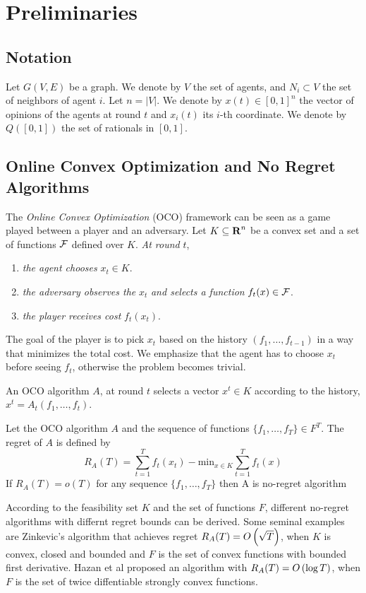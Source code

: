 \section{Preliminaries}\label{s:preliminaries}
\subsection{Notation}
Let $G(V,E)$ be a graph. We denote by $V$ the set of agents,
and $N_{i} \subset V$ the set of neighbors of agent $i$. Let $n = |V|$.
We denote by $x(t)\in [0,1]^n$ the vector of opinions of the agents at round
$t$ and $x_i(t)$ its $i$-th coordinate. We denote by $Q([0,1])$
the set of rationals in $[0,1]$.

\subsection{Online Convex Optimization and No Regret Algorithms}
\label{s:preliminaries:oco}
The \emph{Online Convex Optimization} (OCO) framework can be seen
as a game played between a player and an adversary. Let
$K \subseteq \bm{\mathrm{R}}^n$ be a convex set and a set of functions
$\mathcal{F}$ defined over $K$. \emph{At round }$t$,
\begin{enumerate}
  \item \emph{the agent chooses }$x_t \in K$.

  \item \emph{the adversary observes the }$x_t$\emph{ and selects a function}
    $f_t(x) \in \mathcal{F}$.

  \item \emph{the player receives cost }$f_t(x_t)$.
\end{enumerate}


\noindent The goal of the player is to pick $x_t$ based on the history
$(f_1,\ldots,f_{t-1})$ in a way that minimizes the total cost. We emphasize
that the agent has to choose $x_t$ before seeing $f_t$, otherwise the
problem becomes trivial.
\begin{definition}
An OCO algorithm $A$, at round $t$ selects a vector $x^t \in K$ according to the
history, \(x^t = A_t(f_1,\ldots,f_t)\).
\end{definition}

\begin{definition}
Let the OCO algorithm $A$ and the sequence of functions
$\{f_1,\ldots,f_T\} \in F^T$. The regret of $A$ is defined by
\[R_A(T) = \sum_{t=1}^Tf_t(x_t) - \text{min}_{x \in K}\sum_{t=1}^Tf_t(x)\]
If $R_A(T) = o(T)$ for any sequence $\{f_1,\ldots,f_T\}$ then A is no-regret
algorithm
\end{definition}
%
According to the feasibility set $K$ and the set of functions $F$, different no-regret algorithms with differnt regret bounds can be derived.
Some seminal examples are Zinkevic's algorithm that achieves regret $R_A(T) =O\left(\sqrt{T}\right)$, when $K$ is convex, closed and bounded and
$F$ is the set of convex functions with bounded first derivative. Hazan et al \cite{} proposed an algorithm with $R_A(T) =O\left(\log T\right)$,
when $F$ is the set of twice diffentiable strongly convex functions.\\

